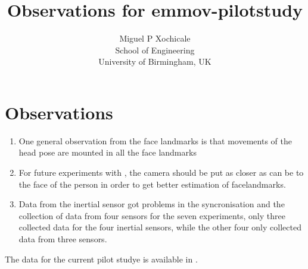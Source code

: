 \documentclass[a4paper,12pt]{article}
\title{Observations for emmov-pilotstudy}
\author{Miguel P Xochicale \\
School of Engineering\\
University of Birmingham, UK}
\begin{document}
\maketitle




\section{Observations}


\begin{enumerate}
\item One general observation from the face landmarks is that 
movements of the head pose are mounted in all the face landmarks 

\item For future experiments with \cite{baltrusaitis2016}, the camera 
should be put as closer as can be to the face of the person 
in order to get better estimation of facelandmarks.

\item Data from the inertial sensor got problems in the syncronisation
and the collection of data from four sensors for the seven  experiments,
only three collected data for the four inertial sensors, while the other 
four only collected data from three sensors.

\end{enumerate}


The data for the current pilot studye is available in \cite{mxochicale2018}.












\end{document}
